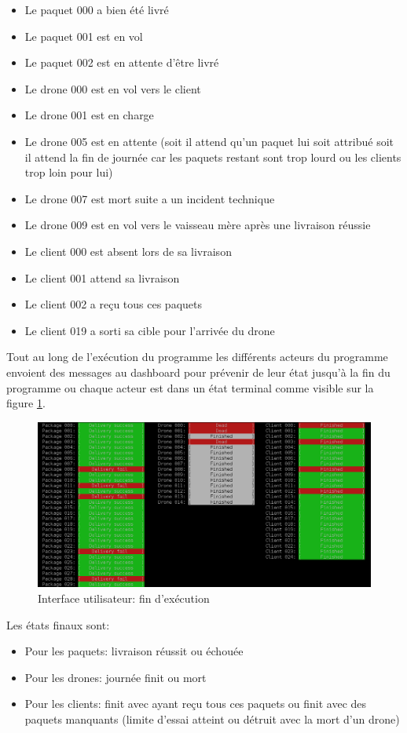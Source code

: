 \documentclass[article, backcover, french, nodocumentinfo]{upmethodology-document}
\begin{document}
					\begin{itemize}
						\item Le paquet 000 a bien été livré
						\item Le paquet 001 est en vol
						\item Le paquet 002 est en attente d’être livré
						\item Le drone 000 est en vol vers le client
						\item Le drone 001 est en charge
						\item Le drone 005 est en attente (soit il attend qu'un paquet lui soit attribué soit il attend la fin de journée car les paquets restant sont trop lourd ou les clients trop loin pour lui)
						\item Le drone 007 est mort suite a un incident technique
						\item Le drone 009 est en vol vers le vaisseau mère après une livraison réussie
						\item Le client 000 est absent lors de sa livraison
						\item Le client 001 attend sa livraison
						\item Le client 002 a reçu tous ces paquets
						\item Le client 019 a sorti sa cible pour l'arrivée du drone
					\end{itemize}
					Tout au long de l’exécution du programme les différents acteurs du programme envoient des messages au dashboard pour prévenir de leur état jusqu’à la fin du programme ou chaque acteur est dans un état terminal comme visible sur la figure \ref{fig:UIend}.
					\begin{figure}[H]
						\centering
						\includegraphics[width=\textwidth]{figures/UI2}
						\caption{Interface utilisateur: fin d’exécution}
						\label{fig:UIend}
					\end{figure}
					Les états finaux sont:
					\begin{itemize}
						\item Pour les paquets: livraison réussit ou échouée
						\item Pour les drones: journée finit ou mort
						\item Pour les clients: finit avec ayant reçu tous ces paquets ou finit avec des paquets manquants (limite d'essai atteint ou détruit avec la mort d'un drone)
					\end{itemize}
\end{document}
